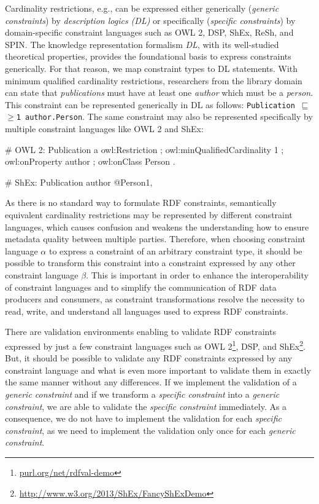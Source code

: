 \documentclass{llncs}
\newcommand{\ms}[1]{\texttt{#1}}
\begin{document}
Cardinality restrictions, e.g., can be expressed either generically (\emph{generic constraints}) by \emph{description logics (DL)} 
or specifically (\emph{specific constraints}) by domain-specific constraint languages such as OWL 2, DSP, ShEx, ReSh, and SPIN.
The knowledge representation formalism {\em DL}, with its  well-studied theoretical properties, provides the foundational basis to express constraints generically. 
For that reason, we map constraint types to DL statements.
With minimum qualified cardinality restrictions, researchers from the library domain can state
that \emph{publications} must have at least one \emph{author} which must be a \emph{person}.
This constraint can be represented generically in DL as follows: \ms{Publication $\sqsubseteq$ $\geq$1 author.Person}.
The same constraint may also be represented specifically by multiple constraint languages like OWL 2 and ShEx:

\begin{ex}
# OWL 2:
Publication
    a owl:Restriction ;
    owl:minQualifiedCardinality 1 ;
    owl:onProperty author ;
    owl:onClass Person .
		
# ShEx:
Publication { author @Person{1, } }
\end{ex}

As there is no standard way to formulate RDF constraints, 
semantically equivalent cardinality restrictions may be represented by different constraint languages, which causes confusion and weakens the understanding how to ensure metadata quality between multiple parties. 
Therefore, when choosing constraint language \ms{$\alpha$} to express a constraint of an arbitrary constraint type, it should be possible to transform this constraint into a constraint expressed by any other constraint language \ms{$\beta$}. 
This is important in order to enhance the interoperability of constraint languages and to simplify the communication of RDF data producers and consumers, 
as constraint transformations resolve the necessity to read, write, and understand all languages used to express RDF constraints.

There are validation environments enabling to validate RDF constraints expressed by just a few constraint languages such as OWL 2\footnote{\url{purl.org/net/rdfval-demo}\label{footnote1}}, DSP, and ShEx\footnote{\url{http://www.w3.org/2013/ShEx/FancyShExDemo}}.
But, it should be possible to validate any RDF constraints expressed by any constraint language and 
what is even more important to validate them in exactly the same manner without any differences. 
If we implement the validation of a \emph{generic constraint} and if we transform a \emph{specific constraint} into a \emph{generic constraint}, we are able to validate the \emph{specific constraint} immediately. 
As a consequence, we do not have to implement the validation for each \emph{specific constraint}, as we need to implement the validation only once for each \emph{generic constraint}. 
\end{document}
